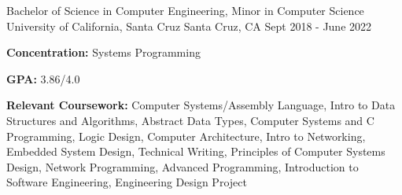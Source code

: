 
\begin{cventries}
  \cventry
    {Bachelor of Science in Computer Engineering, Minor in Computer Science} %
    {University of California, Santa Cruz} %
    {Santa Cruz, CA} %
    {Sept 2018 - June 2022} %
    {
    \begin{cvitems}
        \item {\textbf{Concentration:} Systems Programming}
        \vspace{0.5mm}
        \item {\textbf{GPA:} 3.86/4.0}
        \item {\textbf{Relevant Coursework:} Computer Systems/Assembly Language, Intro to Data Structures and Algorithms, Abstract Data Types, Computer Systems and C Programming, Logic Design, Computer Architecture, Intro to Networking, Embedded System Design, %
        Technical Writing, Principles of Computer Systems Design, Network Programming, Advanced Programming, Introduction to Software Engineering, Engineering Design Project}
    \end{cvitems}
    }
\end{cventries}
